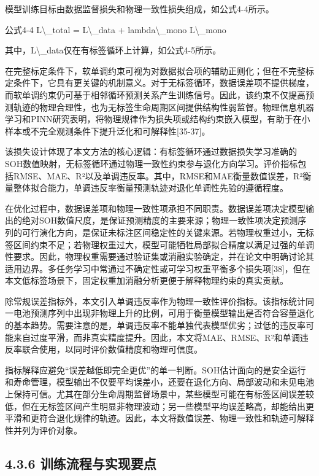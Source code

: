 \documentclass[12pt, a4paper]{ctexart}
\begin{document}
模型训练目标由数据监督损失和物理一致性损失组成，如公式4-4所示。


公式4-4  L\textbackslash{}\_total = L\textbackslash{}\_data + lambda\textbackslash{}\_mono L\textbackslash{}\_mono


其中，L\textbackslash{}\_data仅在有标签循环上计算，如公式4-5所示。


在完整标定条件下，软单调约束可视为对数据拟合项的辅助正则化；但在不完整标定条件下，它具有更关键的机制意义。对于无标签循环，数据误差项不提供梯度，而软单调约束仍可基于相邻循环预测关系产生训练信号。因此，该约束不仅提高预测轨迹的物理合理性，也为无标签生命周期区间提供结构性弱监督。物理信息机器学习和PINN研究表明，将物理规律作为损失项或结构约束嵌入模型，有助于在小样本或不完全观测条件下提升泛化和可解释性[35-37]。


该损失设计体现了本文方法的核心逻辑：有标签循环通过数据损失学习准确的SOH数值映射，无标签循环通过物理一致性约束参与退化方向学习。评价指标包括RMSE、MAE、R²以及单调违反率。其中，RMSE和MAE衡量数值误差，R²衡量整体拟合能力，单调违反率衡量预测轨迹对退化单调性先验的遵循程度。


在优化过程中，数据误差项和物理一致性项承担不同职责。数据误差项决定模型输出的绝对SOH数值尺度，是保证预测精度的主要来源；物理一致性项决定预测序列的可行演化方向，是保证未标注区间稳定性的关键来源。若物理权重过小，无标签区间约束不足；若物理权重过大，模型可能牺牲局部拟合精度以满足过强的单调性要求。因此，物理权重需要通过验证集或消融实验确定，并在论文中明确讨论其适用边界。多任务学习中常通过不确定性或可学习权重平衡多个损失项[38]，但在本文低标签场景下，固定权重加消融分析更便于解释物理约束的真实贡献。


除常规误差指标外，本文引入单调违反率作为物理一致性评价指标。该指标统计同一电池预测序列中出现非物理上升的比例，可用于衡量模型输出是否符合容量退化的基本趋势。需要注意的是，单调违反率不能单独代表模型优劣；过低的违反率可能来自过度平滑，而非真实精度提升。因此，本文将MAE、RMSE、R²和单调违反率联合使用，以同时评价数值精度和物理可信度。


指标解释应避免“误差越低即完全更优”的单一判断。SOH估计面向的是安全运行和寿命管理，模型输出不仅要平均误差小，还要在退化方向、局部波动和未见电池上保持可信。尤其在部分生命周期监督场景中，某些模型可能在有标签区间误差较低，但在无标签区间产生明显非物理波动；另一些模型平均误差略高，却能给出更平滑和更符合退化规律的轨迹。因此，本文将数值误差、物理一致性和轨迹可解释性并列为评价对象。



\subsection{4.3.6 训练流程与实现要点}
\end{document}
